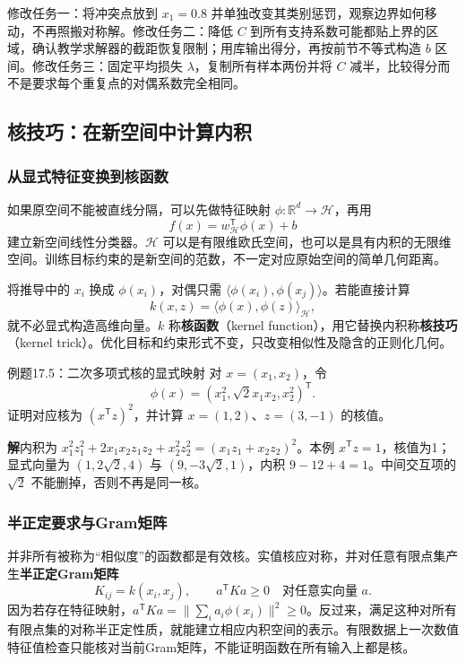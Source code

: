 \documentclass[UTF8,fontset=none,zihao=-4,a4paper]{ctexart}
\newcommand{\term}[1]{\textbf{#1}}
\newcommand{\sol}{\par\noindent\textbf{解}\quad}
\numberwithin{equation}{section}
\numberwithin{figure}{section}
\begin{document}
修改任务一：将冲突点放到 $x_1=0.8$ 并单独改变其类别惩罚，观察边界如何移动，不再照搬对称解。修改任务二：降低 $C$ 到所有支持系数可能都贴上界的区域，确认教学求解器的截距恢复限制；用库输出得分，再按前节不等式构造 $b$ 区间。修改任务三：固定平均损失 $\lambda$，复制所有样本两份并将 $C$ 减半，比较得分而不是要求每个重复点的对偶系数完全相同。

\subsection{核技巧：在新空间中计算内积}
\subsubsection{从显式特征变换到核函数}
如果原空间不能被直线分隔，可以先做特征映射 $\phi:\mathbb R^d\to\mathcal H$，再用
\[
 f(x)=w_{\mathcal H}^{\mathsf T}\phi(x)+b
\]
建立新空间线性分类器。$\mathcal H$ 可以是有限维欧氏空间，也可以是具有内积的无限维空间。训练目标约束的是新空间的范数，不一定对应原始空间的简单几何距离。

将推导中的 $x_i$ 换成 $\phi(x_i)$，对偶只需 $\langle\phi(x_i),\phi(x_j)\rangle$。若能直接计算
\[
 k(x,z)=\langle\phi(x),\phi(z)\rangle_{\mathcal H},
\]
就不必显式构造高维向量。$k$ 称\term{核函数}（kernel function），用它替换内积称\term{核技巧}（kernel trick）。优化目标和约束形式不变，只改变相似性及隐含的正则化几何。

\begin{infobox}[unbreakable]{例题17.5：二次多项式核的显式映射}
对 $x=(x_1,x_2)$，令
\[
 \phi(x)=(x_1^2,\sqrt2x_1x_2,x_2^2)^{\mathsf T}.
\]
证明对应核为 $(x^{\mathsf T}z)^2$，并计算 $x=(1,2)$、$z=(3,-1)$ 的核值。
\sol 内积为 $x_1^2z_1^2+2x_1x_2z_1z_2+x_2^2z_2^2=(x_1z_1+x_2z_2)^2$。本例 $x^{\mathsf T}z=1$，核值为1；显式向量为 $(1,2\sqrt2,4)$ 与 $(9,-3\sqrt2,1)$，内积 $9-12+4=1$。中间交互项的 $\sqrt2$ 不能删掉，否则不再是同一核。
\end{infobox}

\subsubsection{半正定要求与Gram矩阵}
并非所有被称为“相似度”的函数都是有效核。实值核应对称，并对任意有限点集产生\term{半正定Gram矩阵}
\[
 K_{ij}=k(x_i,x_j),\qquad a^{\mathsf T}Ka\ge0\quad\text{对任意实向量 }a.
\]
因为若存在特征映射，$a^{\mathsf T}Ka=\|\sum_i a_i\phi(x_i)\|^2\ge0$。反过来，满足这种对所有有限点集的对称半正定性质，就能建立相应内积空间的表示。有限数据上一次数值特征值检查只能核对当前Gram矩阵，不能证明函数在所有输入上都是核。
\end{document}
